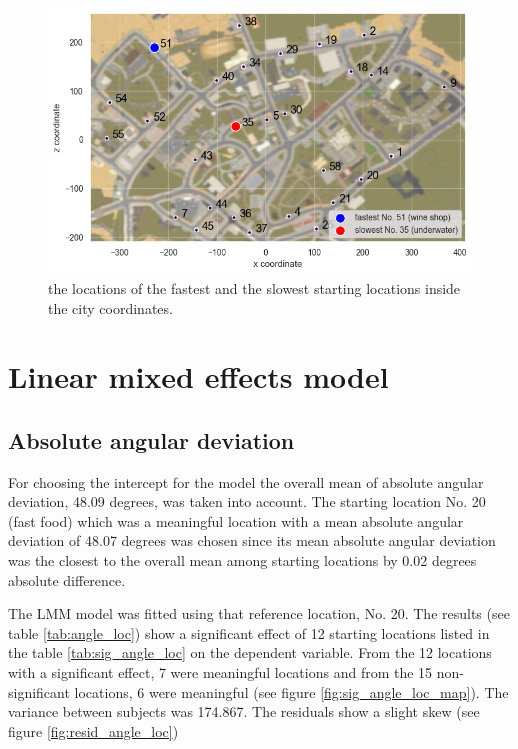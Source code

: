 \begin{figure}[!htb]
	\centering
	\includegraphics[width=140mm]{figures/fastest_slowest_starting_locations_RT_map.png}
	\caption[Locations of fastest and slowest starting locations in city]{the locations of the fastest and the slowest starting locations inside the city coordinates.}
	\label{fig:fastest_slowest_locs}
\end{figure}

\section{Linear mixed effects model}

\subsection{Absolute angular deviation}

For choosing the intercept for the model the overall mean of absolute angular deviation, 48.09 degrees, was taken into account. The starting location No. 20 (fast food) which was a meaningful location with a mean absolute angular deviation of 48.07 degrees was chosen since its mean absolute angular deviation was the closest to the overall mean among starting locations by 0.02 degrees absolute difference.

The LMM model was fitted using that reference location, No. 20. The results (see table \ref{tab:angle_loc}) show a significant effect of 12 starting locations listed in the table \ref{tab:sig_angle_loc} on the dependent variable. From the 12 locations with a significant effect, 7 were meaningful locations and from the 15 non-significant locations, 6 were meaningful (see figure \ref{fig:sig_angle_loc_map}). The variance between subjects was 174.867. The residuals show a slight skew (see figure \ref{fig:resid_angle_loc})

